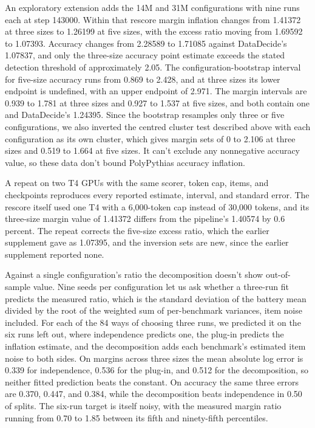 An exploratory extension adds the 14M and 31M configurations with nine runs each at step 143000. Within that rescore margin inflation changes from 1.41372 at three sizes to 1.26199 at five sizes, with the excess ratio moving from 1.69592 to 1.07393. Accuracy changes from 2.28589 to 1.71085 against DataDecide's 1.07837, and only the three-size accuracy point estimate exceeds the stated detection threshold of approximately 2.05. The configuration-bootstrap interval for five-size accuracy runs from 0.869 to 2.428, and at three sizes its lower endpoint is undefined, with an upper endpoint of 2.971. The margin intervals are 0.939 to 1.781 at three sizes and 0.927 to 1.537 at five sizes, and both contain one and DataDecide's 1.24395. Since the bootstrap resamples only three or five configurations, we also inverted the centred cluster test described above with each configuration as its own cluster, which gives margin sets of 0 to 2.106 at three sizes and 0.519 to 1.664 at five sizes. It can't exclude any nonnegative accuracy value, so these data don't bound PolyPythias accuracy inflation.

A repeat on two T4 GPUs with the same scorer, token cap, items, and checkpoints reproduces every reported estimate, interval, and standard error. The rescore itself used one T4 with a 6,000-token cap instead of 30,000 tokens, and its three-size margin value of 1.41372 differs from the pipeline's 1.40574 by 0.6 percent. The repeat corrects the five-size excess ratio, which the earlier supplement gave as 1.07395, and the inversion sets are new, since the earlier supplement reported none.

Against a single configuration's ratio the decomposition doesn't show out-of-sample value. Nine seeds per configuration let us ask whether a three-run fit predicts the measured ratio, which is the standard deviation of the battery mean divided by the root of the weighted sum of per-benchmark variances, item noise included. For each of the 84 ways of choosing three runs, we predicted it on the six runs left out, where independence predicts one, the plug-in predicts the inflation estimate, and the decomposition adds each benchmark's estimated item noise to both sides. On margins across three sizes the mean absolute log error is 0.339 for independence, 0.536 for the plug-in, and 0.512 for the decomposition, so neither fitted prediction beats the constant. On accuracy the same three errors are 0.370, 0.447, and 0.384, while the decomposition beats independence in 0.50 of splits. The six-run target is itself noisy, with the measured margin ratio running from 0.70 to 1.85 between its fifth and ninety-fifth percentiles.

